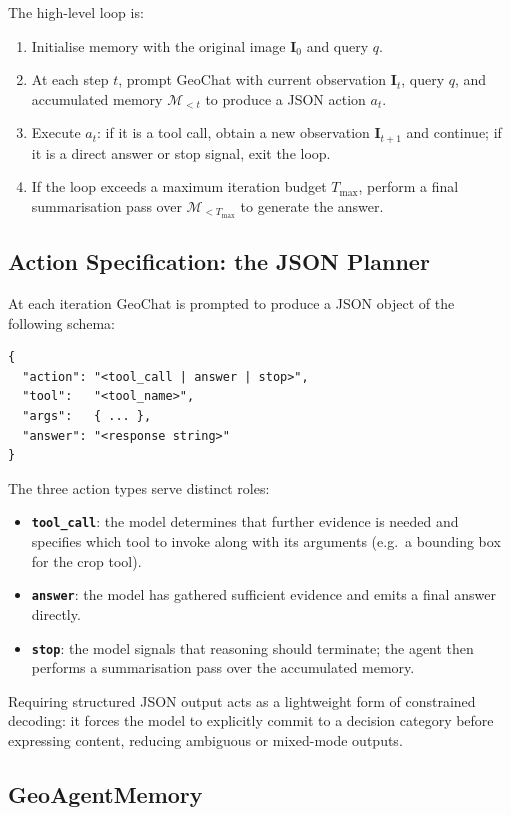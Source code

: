 \documentclass{article}
\begin{document}
The high-level loop is:
\begin{enumerate}
  \item Initialise memory with the original image $\mathbf{I}_0$ and query $q$.
  \item At each step $t$, prompt GeoChat with current observation $\mathbf{I}_t$,
    query $q$, and accumulated memory $\mathcal{M}_{<t}$ to produce a JSON action
    $a_t$.
  \item Execute $a_t$: if it is a tool call, obtain a new observation
    $\mathbf{I}_{t+1}$ and continue; if it is a direct answer or stop signal, exit
    the loop.
  \item If the loop exceeds a maximum iteration budget $T_{\max}$, perform a final
    summarisation pass over $\mathcal{M}_{<T_{\max}}$ to generate the answer.
\end{enumerate}

\subsection{Action Specification: the JSON Planner}

At each iteration GeoChat is prompted to produce a JSON object of the following
schema:
\begin{verbatim}
{
  "action": "<tool_call | answer | stop>",
  "tool":   "<tool_name>",
  "args":   { ... },
  "answer": "<response string>"
}
\end{verbatim}

The three action types serve distinct roles:
\begin{itemize}
  \item \textbf{\texttt{tool\_call}}: the model determines that further evidence is
    needed and specifies which tool to invoke along with its arguments (e.g.\ a
    bounding box for the crop tool).
  \item \textbf{\texttt{answer}}: the model has gathered sufficient evidence and
    emits a final answer directly.
  \item \textbf{\texttt{stop}}: the model signals that reasoning should terminate;
    the agent then performs a summarisation pass over the accumulated memory.
\end{itemize}

Requiring structured JSON output acts as a lightweight form of constrained
decoding: it forces the model to explicitly commit to a decision category before
expressing content, reducing ambiguous or mixed-mode outputs.

\subsection{GeoAgentMemory}
\end{document}
